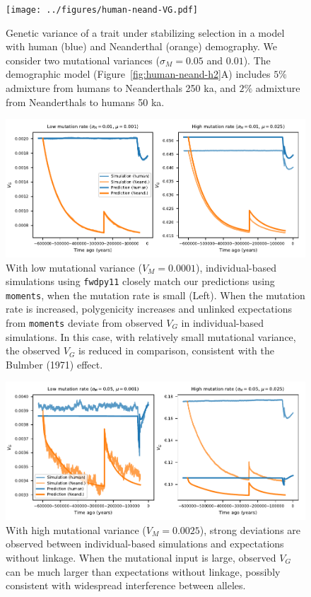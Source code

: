 \documentclass[]{article}
\newcommand{\moments}{\texttt{moments}\xspace}
\newcommand{\fwdpy}{\texttt{fwdpy11}\xspace}
\begin{document}
\begin{figure}[t!]
    \centering
    \texttt{[image: ../figures/human-neand-VG.pdf]}
    \caption{
        Genetic variance of a trait under stabilizing selection in a model with
        human (blue) and Neanderthal (orange) demography. We consider two
        mutational variances ($\sigma_M=0.05$ and $0.01$). The demographic model
        (Figure~\ref{fig:human-neand-h2}A) includes $5\%$ admixture from humans
        to Neanderthals 250 ka, and $2\%$ admixture from Neanderthals to humans
        50 ka.
    }
    \label{fig:human-neand-VG}
\end{figure}


\begin{figure}[ht!]
    \centering
    \includegraphics{../figures/model_comparison.SD_0.01.mu_0.001_0.025.pdf}
    \caption{
        With low mutational variance ($V_M=0.0001$), individual-based simulations
        using \fwdpy closely match our predictions using \moments, when the
        mutation rate is small (Left). When the mutation rate is increased,
        polygenicity increases and unlinked expectations from \moments deviate
        from observed $V_G$ in individual-based simulations. In this case, with
        relatively small mutational variance, the observed $V_G$ is reduced in
        comparison, consistent with the Bulmber (1971) effect.
    }
    \label{fig:supp-low-VM}
\end{figure}

\begin{figure}[ht!]
    \centering 
    \includegraphics{../figures/model_comparison.SD_0.05.mu_0.001_0.025.pdf}
    \caption{
        With high mutational variance ($V_M=0.0025$), strong deviations are
        observed between individual-based simulations and expectations without
        linkage. When the mutational input is large, observed $V_G$ can be
        much larger than expectations without linkage, possibly consistent with
        widespread interference between alleles.
    }
    \label{fig:supp-high-VM}
\end{figure}
\end{document}
